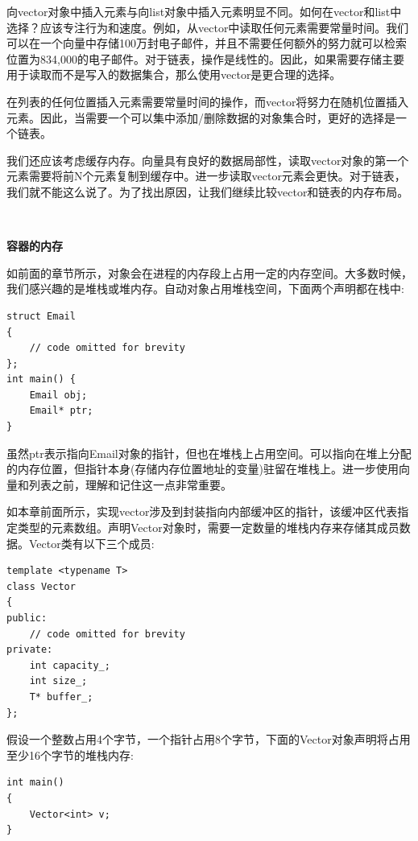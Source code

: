 向vector对象中插入元素与向list对象中插入元素明显不同。如何在vector和list中选择？应该专注行为和速度。例如，从vector中读取任何元素需要常量时间。我们可以在一个向量中存储100万封电子邮件，并且不需要任何额外的努力就可以检索位置为834,000的电子邮件。对于链表，操作是线性的。因此，如果需要存储主要用于读取而不是写入的数据集合，那么使用vector是更合理的选择。 \par
在列表的任何位置插入元素需要常量时间的操作，而vector将努力在随机位置插入元素。因此，当需要一个可以集中添加/删除数据的对象集合时，更好的选择是一个链表。 \par
我们还应该考虑缓存内存。向量具有良好的数据局部性，读取vector对象的第一个元素需要将前N个元素复制到缓存中。进一步读取vector元素会更快。对于链表，我们就不能这么说了。为了找出原因，让我们继续比较vector和链表的内存布局。 \par

\noindent\textbf{}\ \par
\textbf{容器的内存} \ \par
如前面的章节所示，对象会在进程的内存段上占用一定的内存空间。大多数时候，我们感兴趣的是堆栈或堆内存。自动对象占用堆栈空间，下面两个声明都在栈中: \par

\begin{lstlisting}[caption={}]
struct Email
{
	// code omitted for brevity
};
int main() {
	Email obj;
	Email* ptr;
}
\end{lstlisting}

虽然ptr表示指向Email对象的指针，但也在堆栈上占用空间。可以指向在堆上分配的内存位置，但指针本身(存储内存位置地址的变量)驻留在堆栈上。进一步使用向量和列表之前，理解和记住这一点非常重要。 \par
如本章前面所示，实现vector涉及到封装指向内部缓冲区的指针，该缓冲区代表指定类型的元素数组。声明Vector对象时，需要一定数量的堆栈内存来存储其成员数据。Vector类有以下三个成员: \par

\begin{lstlisting}[caption={}]
template <typename T>
class Vector
{
public:
	// code omitted for brevity
private:
	int capacity_;
	int size_;
	T* buffer_;
};
\end{lstlisting}

假设一个整数占用4个字节，一个指针占用8个字节，下面的Vector对象声明将占用至少16个字节的堆栈内存: \par

\begin{lstlisting}[caption={}]
int main()
{
	Vector<int> v;
}
\end{lstlisting}

